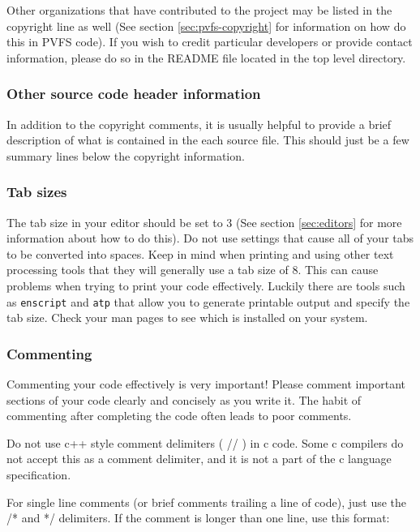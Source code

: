 \documentclass[11pt, letterpaper]{article}
\begin{document}
Other organizations that have contributed to the project may be listed
in the copyright line as well (See section \ref{sec:pvfs-copyright} for information on how do this in PVFS code).  If you wish to credit particular developers or
provide contact information, please do so in the README file located in
the top level directory.

\subsubsection{Other source code header information}

In addition to the copyright comments, it is usually
helpful to provide a brief description of what is contained in the
each source file.  This should just be a few summary lines below the
copyright information.

\subsubsection{Tab sizes}

The tab size in your editor should be set to 3 (See section
\ref{sec:editors} for more information about how to do this).  Do not
use settings that cause all of your tabs to be converted into spaces.
Keep in mind when printing and using other text processing tools that
they will generally use a tab size of 8.  This can cause problems when
trying to print your code effectively.  Luckily there are tools such as
{\tt enscript} and {\tt atp} that allow you to generate printable output
and specify the tab size.  Check your man pages to see which is
installed on your system.

\subsubsection{Commenting}
\label{sec:comments}

Commenting your code effectively is very important!  Please comment
important sections of your code clearly and concisely as you write it.
The habit of commenting after completing the code often leads to poor
comments.  

Do not use c++ style comment delimiters ( // ) in c code.  Some c
compilers do not accept this as a comment delimiter, and it is not a
part of the c language specification. 

For single line comments (or brief comments trailing a line of code),
just use the /* and */ delimiters.  If the comment is longer than one
line, use this format:
\end{document}
